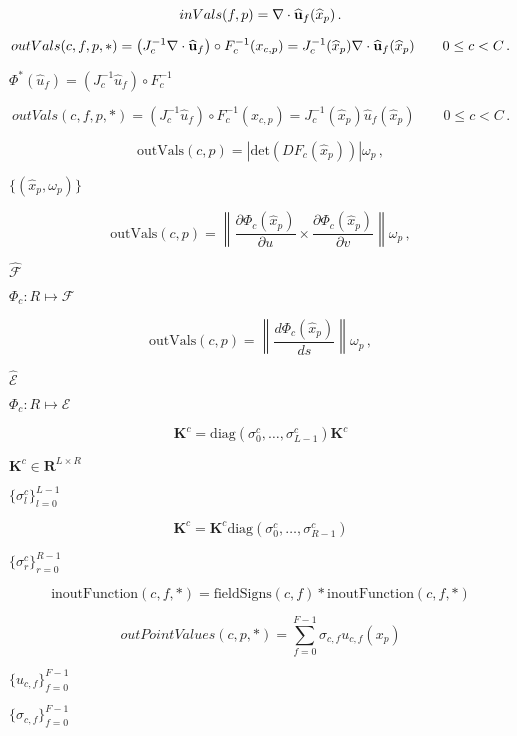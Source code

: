 \documentclass{article}
\begin{document}
\[
         inVals(f,p) = \nabla\cdot\widehat{\bf u}_f(\widehat{x}_p) \,.
  \]
\pagebreak

\[
         outVals(c,f,p,*) 
            = \left(J^{-1}_{c}\nabla\cdot\widehat{\bf u}_{f}\right) \circ F^{-1}_{c} (x_{c,p}) 
            = J^{-1}_{c}(\widehat{x}_p) \nabla\cdot\widehat{\bf u}_{f} (\widehat{x}_p)
            \qquad 0\le c < C \,.
  \]
\pagebreak

$\Phi^*(\widehat{u}_f) = \left(J^{-1}_{c}\widehat{u}_{f}\right) \circ F^{-1}_{c} $
\pagebreak

\[
         outVals(c,f,p,*) 
            = \left(J^{-1}_{c}\widehat{u}_{f}\right) \circ F^{-1}_{c} (x_{c,p}) 
            = J^{-1}_{c}(\widehat{x}_p) \widehat{u}_{f} (\widehat{x}_p)
            \qquad 0\le c < C \,.
  \]
\pagebreak

\[
         \mbox{outVals}(c,p)   = |\mbox{det}(DF_{c}(\widehat{x}_p))|\omega_{p} \,,
  \]
\pagebreak

$\{(\widehat{x}_p,\omega_p)\}$
\pagebreak

\[
         \mbox{outVals}(c,p)   = 
          \left\|\frac{\partial\Phi_c(\widehat{x}_p)}{\partial u}\times 
                 \frac{\partial\Phi_c(\widehat{x}_p)}{\partial v}\right\|\omega_{p} \,,
\]
\pagebreak

$\widehat{\mathcal{F}}$
\pagebreak

$ \Phi_c : R \mapsto \mathcal{F} $
\pagebreak

\[
         \mbox{outVals}(c,p)   = 
              \left\|\frac{d \Phi_c(\widehat{x}_p)}{d s}\right\|\omega_{p} \,,
\]
\pagebreak

$\widehat{\mathcal{E}}$
\pagebreak

$ \Phi_c : R \mapsto \mathcal{E} $
\pagebreak

\[
       \mathbf{K}^{c} = \mbox{diag}(\sigma^c_0,\ldots,\sigma^c_{L-1}) \mathbf{K}^c 
\]
\pagebreak

$\mathbf{K}^{c} \in \mathbf{R}^{L\times R}$
\pagebreak

$\{\sigma^c_l\}_{l=0}^{L-1}$
\pagebreak

\[
       \mathbf{K}^{c} = \mathbf{K}^c \mbox{diag}(\sigma^c_0,\ldots,\sigma^c_{R-1})
\]
\pagebreak

$\{\sigma^c_r\}_{r=0}^{R-1}$
\pagebreak

\[    
       \mbox{inoutFunction}(c,f,*) = \mbox{fieldSigns}(c,f)*\mbox{inoutFunction}(c,f,*)
\]
\pagebreak

\[
       outPointValues(c,p,*) = \sum_{f=0}^{F-1} \sigma_{c,f} u_{c,f}(x_p)
\]
\pagebreak

$\{u_{c,f}\}_{f=0}^{F-1} $
\pagebreak

$\{\sigma_{c,f}\}_{f=0}^{F-1} $
\pagebreak
\end{document}
